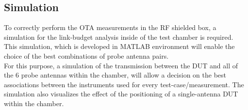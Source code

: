 \subsection{Simulation} 
To correctly perform the \acs{OTA} measurements in the \acs{RF} shielded box, a simulation for the link-budget analysis inside of the test chamber is required. This simulation, which is developed in MATLAB\textregistered{} environment will enable the choice of the best combinations of probe antenna pairs. \\

 For this purpose, a simulation of the transmission between the \acs{DUT} and all of the 6 probe antennas within the chamber, will allow a decision on the best associations between the instruments used for every test-case/measurement. The simulation also visualizes the effect of the positioning of a single-antenna \acs{DUT} within the chamber. \\
 
